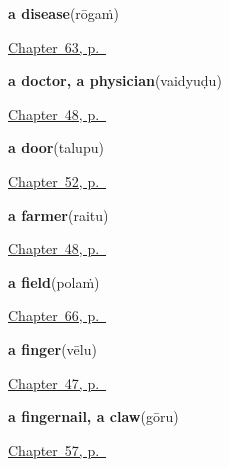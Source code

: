 \noindent\begin{minipage}[t]{\linewidth}
\raggedright
\textbf{a disease}\enspace\emph{}\enspace(rōgaṁ)\par
\footnotesize \hyperref[ch:te-health]{Chapter~63, p.~\pageref*{ch:te-health}}
\end{minipage}\par\smallskip

\noindent\begin{minipage}[t]{\linewidth}
\raggedright
\textbf{a doctor, a physician}\enspace\emph{}\enspace(vaidyuḍu)\par
\footnotesize \hyperref[ch:te-roles]{Chapter~48, p.~\pageref*{ch:te-roles}}
\end{minipage}\par\smallskip

\noindent\begin{minipage}[t]{\linewidth}
\raggedright
\textbf{a door}\enspace\emph{}\enspace(talupu)\par
\footnotesize \hyperref[ch:te-welcome]{Chapter~52, p.~\pageref*{ch:te-welcome}}
\end{minipage}\par\smallskip

\noindent\begin{minipage}[t]{\linewidth}
\raggedright
\textbf{a farmer}\enspace\emph{}\enspace(raitu)\par
\footnotesize \hyperref[ch:te-roles]{Chapter~48, p.~\pageref*{ch:te-roles}}
\end{minipage}\par\smallskip

\noindent\begin{minipage}[t]{\linewidth}
\raggedright
\textbf{a field}\enspace\emph{}\enspace(polaṁ)\par
\footnotesize \hyperref[ch:te-the-field]{Chapter~66, p.~\pageref*{ch:te-the-field}}
\end{minipage}\par\smallskip

\noindent\begin{minipage}[t]{\linewidth}
\raggedright
\textbf{a finger}\enspace\emph{}\enspace(vēlu)\par
\footnotesize \hyperref[ch:te-body-more]{Chapter~47, p.~\pageref*{ch:te-body-more}}
\end{minipage}\par\smallskip

\noindent\begin{minipage}[t]{\linewidth}
\raggedright
\textbf{a fingernail, a claw}\enspace\emph{}\enspace(gōru)\par
\footnotesize \hyperref[ch:te-more-body]{Chapter~57, p.~\pageref*{ch:te-more-body}}
\end{minipage}\par\smallskip

